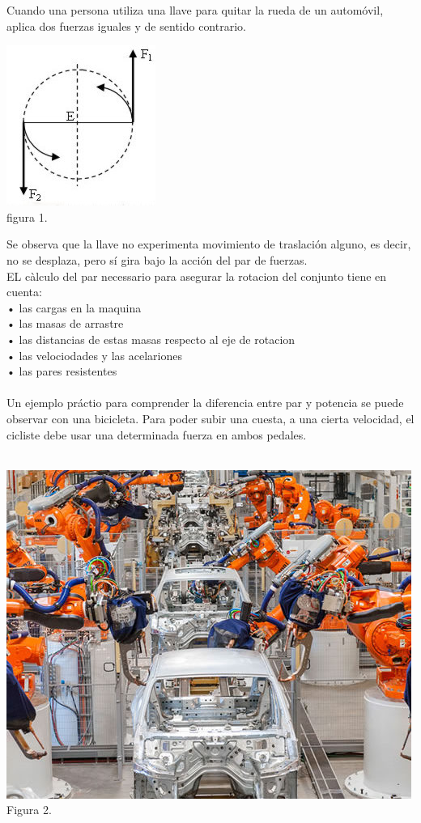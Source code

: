 \documentclass[12pt,a4paper]{report}
\begin{document}
Cuando una persona utiliza una llave para quitar la rueda de un automóvil, aplica dos fuerzas iguales y de sentido contrario.\\
\begin{center}
\includegraphics[scale=1]{Imagenes/imagen2.jpg}
\\figura 1.
\end{center}
Se observa que la llave no experimenta movimiento de traslación alguno, es decir, no se desplaza, pero sí gira bajo la acción del par de fuerzas.\\
EL càlculo del par necessario para asegurar la rotacion del conjunto tiene en cuenta:\\
  • las cargas en la maquina\\
   • las masas de arrastre\\
   • las distancias de estas masas respecto al eje de rotacion\\
   • las velociodades y las acelariones\\
   • las pares resistentes\\
\\
Un ejemplo práctio para comprender la diferencia entre par y potencia se puede observar con una bicicleta. Para poder subir una cuesta, a una cierta velocidad, el cicliste debe usar una determinada fuerza en ambos pedales.\\
\\
\begin{center}
\includegraphics[scale=1]{Imagenes/imagen3.jpg}
\\Figura 2. 
\end{center}
\end{document}
